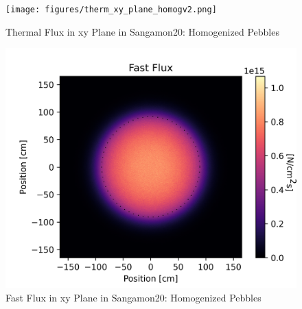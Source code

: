 \begin{figure}[H]
\centering

  \texttt{[image: figures/therm\_xy\_plane\_homogv2.png]}
  \caption{Thermal Flux in xy Plane in Sangamon20: Homogenized Pebbles}
  \label{fig:hom-plane-therm}

\end{figure}


\begin{figure}[H]
\centering

 \includegraphics[width=1.0\linewidth]{figures/fast_xy_plane_homogv2.png}
 \caption{Fast Flux in xy Plane in Sangamon20: Homogenized Pebbles}
 \label{fig:hom-plane-fast}

\end{figure}